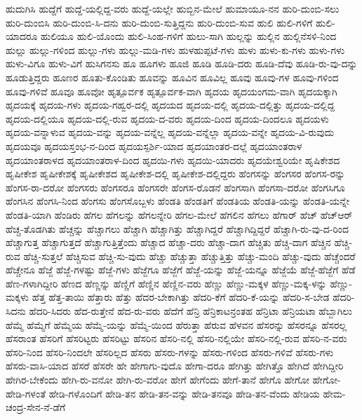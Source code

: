 {ಹುದುಗಿಸಿ
ಹುದ್ದೆಗೆ
ಹುದ್ದೆ-ಯಲ್ಲಿದ್ದ-ವರು
ಹುದ್ದೆ-ಯಲ್ಲೇ
ಹುಬ್ಬಿನ-ಮೇಲೆ
ಹುಮಾಯೂ-ನನ
ಹುರಿ-ದುಂಬಿ-ಸಲು
ಹುರಿ-ದುಂಬಿಸಿ
ಹುರಿ-ದುಂಬಿ-ಸಿ-ದನು
ಹುರಿ-ದುಂಬಿ-ಸುತ್ತಿದ್ದನು
ಹುರಿ-ದುಂಬಿ-ಸುವ
ಹುಲಿ
ಹುಲಿ-ಗಳಿಗೆ
ಹುಲಿ-ಯಾದರೂ
ಹುಲಿಯೂ
ಹುಲಿ-ಯೊಂದು
ಹುಲಿ-ಸಿಂಹ-ಗಳಿಗೆ
ಹುಲು-ಸಾಗಿ
ಹುಲ್ಲನ್ನು
ಹುಲ್ಲಿನ
ಹುಲ್ಲಿನೆಸಳಿ-ನಿಂದ
ಹುಲ್ಲು
ಹುಲ್ಲು-ಗಳಿಂದ
ಹುಲ್ಲು-ಗಳು
ಹುಲ್ಲು-ಮಡಿ-ಗಳು
ಹುಳಹುಪ್ಪಟೆ-ಗಳು
ಹುಳು
ಹುಳು-ಕು-ಗಳು
ಹುಳು-ಗಳು
ಹುಳು-ವಿಗೂ
ಹುಳು-ವಿಗೆ
ಹುಸಿಗನಸು
ಹೂ
ಹೂಗಳು
ಹೂಜಿ
ಹೂಡಿ
ಹೂಡಿ-ದರು
ಹೂಡಿ-ದೆವು
ಹೂಡಿ-ರು-ವು-ದನ್ನು
ಹೂಡುತ್ತಿದ್ದರು
ಹೂಣರ
ಹೂತು-ಕೊಂಡಿತು
ಹೂವನ್ನು
ಹೂವಿನ
ಹೂವಿಲ್ಲ
ಹೂವು
ಹೂವು-ಗಳ
ಹೂವು-ಗಳಿಂದ
ಹೂವು-ಗಳಿವೆ
ಹೂವೂ
ಹೂವೋ
ಹೃತ್ಪೂರ್ವಕ
ಹೃತ್ಪೂರ್ವಕ-ವಾಗಿ
ಹೃದಯ
ಹೃದಯಂಗಮ-ವಾಗಿ
ಹೃದಯಕ್ಕಾಗಿ
ಹೃದಯಕ್ಕೆ
ಹೃದಯ-ಗಳು
ಹೃದಯ-ಗಹ್ವರ-ದಲ್ಲಿ
ಹೃದಯದ
ಹೃದಯ-ದಲ್ಲಿ
ಹೃದಯ-ದಲ್ಲಿತ್ತು
ಹೃದಯ-ದಲ್ಲಿದ್ದ
ಹೃದಯ-ದಲ್ಲಿಯೂ
ಹೃದಯ-ದಲ್ಲಿ-ರುವ
ಹೃದಯ-ದ-ವರು
ಹೃದಯ-ದಿಂದ
ಹೃದಯ-ದಿಂದಲೂ
ಹೃದಯಳು
ಹೃದಯ-ವನ್ನಾಳುವ
ಹೃದಯ-ವನ್ನು
ಹೃದಯ-ವನ್ನೆಲ್ಲ
ಹೃದಯ-ವನ್ನೆಲ್ಲಾ
ಹೃದಯ-ವನ್ನೇ
ಹೃದಯ-ವಿ-ರುವುದು
ಹೃದಯವೂ
ಹೃದಯಸ್ತಂಭ-ನ-ದಿಂದ
ಹೃದಯಸ್ಪರ್ಶಿ-ಯಾದ
ಹೃದಯಾಂತರ-ದಲ್ಲೆ
ಹೃದಯಾಂತರಾಳ
ಹೃದಯಾಂತರಾಳದ
ಹೃದಯಾಂತರಾಳ-ದಿಂದ
ಹೃದಯಿ-ಗಳು
ಹೃದಯಿ-ಯಾದರು
ಹೃದಯೇಶ್ವರಿಯೇ
ಹೃಷಿಕೇಶದ
ಹೃಷೀಕೇಶ
ಹೃಷೀಕೇಶಕ್ಕೆ
ಹೃಷೀಕೇಶದ
ಹೃಷೀಕೇಶ-ದಲ್ಲಿ
ಹೃಷೀಕೇಶ-ದಲ್ಲಿದ್ದರು
ಹೆಂಗಸನ್ನು
ಹೆಂಗಸರ
ಹೆಂಗಸ-ರನ್ನು
ಹೆಂಗಸ-ರಾ-ದರೋ
ಹೆಂಗಸರು
ಹೆಂಗಸರೂ
ಹೆಂಗಸರೇ
ಹೆಂಗಸ-ರೊಡನೆ
ಹೆಂಗಸಾಗಿ
ಹೆಂಗಸಾ-ದರೋ
ಹೆಂಗಸಿಗೂ
ಹೆಂಗಸಿನ
ಹೆಂಗಸಿ-ನಿಂದ
ಹೆಂಗಸು
ಹೆಂಗಸೊಬ್ಬಳು
ಹೆಂಡತಿ
ಹೆಂಡತಿಗೆ
ಹೆಂಡತಿಯ
ಹೆಂಡತಿ-ಯನ್ನು
ಹೆಂಡತಿ-ಯನ್ನೇ
ಹೆಂಡತಿ-ಯಾಗಿ
ಹೆಂಡಿರು
ಹೆಗಲ
ಹೆಗಲನ್ನು
ಹೆಗಲನ್ನೇರಿ
ಹೆಗಲ-ಮೇಲೆ
ಹೆಗಲಿನ
ಹೆಗಲು
ಹೆಗಾರ್
ಹೆಚ್
ಹೆಚ್ಆರ್
ಹೆಚ್ಚ-ತೊಡಗಿತು
ಹೆಚ್ಚನ್ನು
ಹೆಚ್ಚಾಗಲು
ಹೆಚ್ಚಾಗಿ
ಹೆಚ್ಚಾಗಿತ್ತು
ಹೆಚ್ಚಾಗಿದ್ದರೆ
ಹೆಚ್ಚಾಗಿದ್ದಿದ್ದರೆ
ಹೆಚ್ಚಾಗಿ-ರು-ವು-ದ-ರಿಂದ
ಹೆಚ್ಚಾಗುತ್ತ
ಹೆಚ್ಚಾಗುತ್ತದೆ
ಹೆಚ್ಚಾಗುತ್ತಿತ್ತೆಂದು
ಹೆಚ್ಚಾದ
ಹೆಚ್ಚಾ-ದರು
ಹೆಚ್ಚಾ-ದಾಗ
ಹೆಚ್ಚಿತು
ಹೆಚ್ಚಿ-ದಾಗ
ಹೆಚ್ಚಿನ
ಹೆಚ್ಚಿ-ರುವ
ಹೆಚ್ಚಿ-ಸುತ್ತಲೆ
ಹೆಚ್ಚಿಸುವ
ಹೆಚ್ಚಿ-ಸು-ವುದು
ಹೆಚ್ಚು
ಹೆಚ್ಚುತ್ತಾ
ಹೆಚ್ಚುತ್ತಿತ್ತು
ಹೆಚ್ಚು-ಮಂದಿ
ಹೆಚ್ಚು-ವುದು
ಹೆಚ್ಚೆಂದರೆ
ಹೆಚ್ಚೇನೂ
ಹೆಜ್ಜೆ
ಹೆಜ್ಜೆ-ಗಳಷ್ಟು
ಹೆಜ್ಜೆ-ಗಳು
ಹೆಜ್ಜೆಗೂ
ಹೆಜ್ಜೆಗೆ
ಹೆಜ್ಜೆ-ಯನ್ನು
ಹೆಜ್ಜೆ-ಯನ್ನೂ
ಹೆಜ್ಜೆಯೆ
ಹೆಜ್ಜೆ-ಹೆಜ್ಜೆಗೆ
ಹೆಡೆ
ಹೆಣ-ಗಳಾಗಿದ್ದೀರಿ
ಹೆಣದ
ಹೆಣ್ಣನ್ನು
ಹೆಣ್ಣಿಗೆ
ಹೆಣ್ಣಿನ
ಹೆಣ್ಣಿನ-ವರು
ಹೆಣ್ಣು
ಹೆಣ್ಣು-ಮಕ್ಕಳ
ಹೆಣ್ಣು-ಮಕ್ಕ-ಳನ್ನು
ಹೆಣ್ಣು-ಮಕ್ಕಳು
ಹೆತ್ತ
ಹೆತ್ತ-ತಾಯಿ
ಹೆತ್ತಾರು
ಹೆತ್ತು
ಹೆದರ-ಬೇಕಾಗಿತ್ತು
ಹೆದರಿ-ಕೆಗೆ
ಹೆದರಿ-ಕೆ-ಯನ್ನು
ಹೆದರಿ-ಸ-ಬೇಡ
ಹೆದರಿ-ಸಿದನು
ಹೆದರಿ-ಸಿದರು
ಹೆದ-ರುತ್ತೇನೆ
ಹೆದ-ರು-ವರು
ಹೆದೆಗೆ
ಹೆನ್ರಿ
ಹೆನ್ರಿಕಾಟನ್ರಂತಹ
ಹೆನ್ರಿಟಾ
ಹೆನ್ರಿಯಟಾ
ಹೆಬ್ಬಾಗಿಲು
ಹೆಮ್ಮೆ
ಹೆಮ್ಮೆಗೆ
ಹೆಮ್ಮೆಯ
ಹೆಮ್ಮೆ-ಯನ್ನು
ಹೆಮ್ಮೆ-ಯಿಂದ
ಹೆರುತ್ತಾ
ಹೆರುವ
ಹೆಳವನ
ಹೆಸರನ್ನು
ಹೆಸರನ್ನೂ
ಹೆಸರಲ್ಲ
ಹೆಸರಾಂತ
ಹೆಸರಿಗೆ
ಹೆಸರಿಟ್ಟರು
ಹೆಸರಿಟ್ಟು
ಹೆಸರಿನ
ಹೆಸರಿ-ನಲ್ಲಿ
ಹೆಸರಿ-ನಲ್ಲಿಯೇ
ಹೆಸರಿ-ನಲ್ಲಿ-ರುವ
ಹೆಸರಿ-ನ-ವರು
ಹೆಸರಿ-ನಿಂದ
ಹೆಸರಿ-ನಿಂದಲೇ
ಹೆಸರಿಲ್ಲದ
ಹೆಸರು
ಹೆಸರು-ಗಳನ್ನು
ಹೆಸರು-ಗಳಿಂದ
ಹೆಸರು-ಗಳಿವೆ
ಹೆಸರು-ಗಳು
ಹೆಸರು-ವಾಸಿ-ಯಾದ
ಹೆಸರೆ
ಹೆಸರೇ
ಹೇ
ಹೇಗಾಗು-ವುದೊ
ಹೇಗಾ-ದರೂ
ಹೇಗಿತ್ತು
ಹೇಗಿತ್ತೊ
ಹೇಗಿದೆ
ಹೇಗಿದ್ದೀರಿ
ಹೇಗಿರ-ಬೇಕೆಂದು
ಹೇಗಿ-ರು-ವನೋ
ಹೇಗಿ-ರು-ವರೋ
ಹೇಗೆ
ಹೇಗೆಂದು
ಹೇಗೆ-ತಾನೆ
ಹೇಗೊ
ಹೇಗೋ
ಹೇಗೋ-
ಹೇಡಿ-ಗಳಂತೆ
ಹೇಡಿ-ಗಳೊಂದಿಗೆ
ಹೇಡಿ-ತನ
ಹೇಡಿ-ತನ-ವನ್ನು
ಹೇಡಿ-ತನವೂ
ಹೇಡಿ-ತನ-ವೆಂದು
ಹೇಡಿಯ
ಹೇಮ-ಚಂದ್ರ-ಸೇನ-ನೆ-ಡೆಗೆ
}
